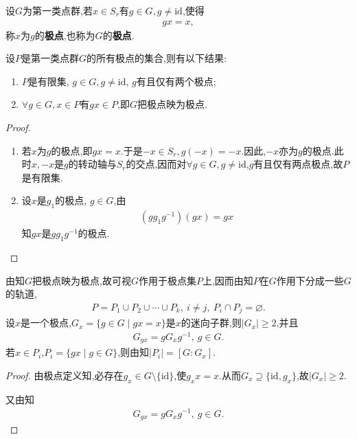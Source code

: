 \documentclass[../../main.tex]{subfiles}%
\begin{document}
\begin{definition}
设$G$为第一类点群,若$x \in S_r$有$g \in G, g \neq \text{id}$,使得
\begin{align*}
gx=x,
\end{align*}
称$x$为$g$的\textbf{极点},也称为$G$的\textbf{极点}.
\end{definition}

\begin{lemma}\label{lemma:抽象代数--引理4.9.1}
设$P$是第一类点群$G$的所有极点的集合,则有以下结果:
\begin{enumerate}[(1)]
\item\label{lemma:抽象代数--引理4.9.1-1} $P$是有限集, $g \in G, g \neq \text{id}$, $g$有且仅有两个极点;

\item\label{lemma:抽象代数--引理4.9.1-2} $\forall g \in G, x \in P$有$gx \in P$,即$G$把极点映为极点.
\end{enumerate}
\end{lemma}
\begin{proof}
\begin{enumerate}[(1)]
\item 若$x$为$g$的极点,即$gx=x$.于是$-x \in S_r, g(-x)=-x$.因此,$-x$亦为$g$的极点.此时$x,-x$是$g$的转动轴与$S_r$的交点,因而对$\forall g \in G, g \neq \text{id}$,$g$有且仅有两点极点,故$P$是有限集.

\item 设$x$是$g_1$的极点, $g \in G$,由
\begin{align*}
(gg_1g^{-1})(gx)=gx
\end{align*}
知$gx$是$gg_1g^{-1}$的极点.
\end{enumerate}

\end{proof}

\begin{corollary}\label{corollary:点群在极点集上的作用--轨道分解和迷向子群}
由知$G$把极点映为极点,故可视$G$作用于极点集$P$上,因而由知$P$在$G$作用下分成一些$G$的轨道,
\begin{align*}
P=P_1\cup P_2\cup\cdots\cup P_k,\ i\neq j,\ P_i\cap P_j=\varnothing.
\end{align*}
设$x$是一个极点,$G_x=\{g\in G\mid gx=x\}$是$x$的迷向子群,则$|G_x|\geqslant 2$,并且
\begin{align*}
G_{gx}=gG_xg^{-1},\ g\in G.
\end{align*}
若$x\in P_i$,$P_i=\{gx\mid g\in G\}$,则由知$|P_i|=[G:G_x]$.
\end{corollary}
\begin{proof}

由极点定义知,必存在$g_x\in G\setminus \{\text{id}\}$,使$g_xx=x$.从而$G_x\supseteq \{\text{id},g_x\}$,故$|G_x|\geqslant 2$.

又由知
\begin{align*}
G_{gx}=gG_xg^{-1},\ g\in G.
\end{align*}

\end{proof}
\end{document}
